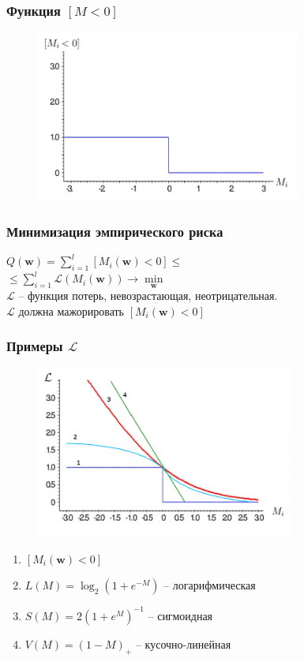 \documentclass[12pt]{beamer}
\begin{document}
\begin{frame}\frametitle{Функция $[M<0]$}
\begin{figure}[htbp]
  \includegraphics[height=160pt, keepaspectratio = true]{images/l1}
\end{figure}
\end{frame}


\begin{frame}\frametitle{Минимизация эмпирического риска}
${Q(\mathbf{w}) = \sum\limits_{i=1}^l \left[ M_i(\mathbf{w}) < 0 \right] \leq}$\\ \vspace{3mm}
\hspace{10mm} ${\leq \sum\limits_{i=1}^l \mathcal{L}(M_i(\mathbf{w})) \rightarrow \min\limits_{\mathbf{w}} }$\\\vspace{3mm}
$\mathcal{L}$ -- функция потерь, невозрастающая, неотрицательная.\\
$\mathcal{L}$ должна мажорировать $\left[M_i(\mathbf{w}) < 0 \right]$
\end{frame}

\begin{frame}\frametitle{Примеры $\mathcal{L}$}
\begin{figure}[htbp]
  \includegraphics[height=160pt, keepaspectratio = true]{images/l}
\end{figure}
\begin{enumerate}
\item $\left[M_i(\mathbf{w}) < 0 \right]$
\item $L(M) = \log_2(1+e^{-M})$ -- логарифмическая
\item $S(M) = 2(1+e^M)^{-1}$ -- сигмоидная
\item $V(M) = (1-M)_+$ -- кусочно-линейная
\end{enumerate}
\end{frame}
\end{document}
